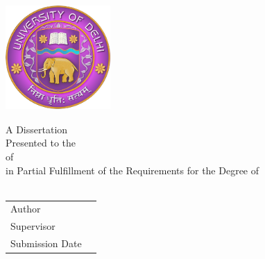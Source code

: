 \begin{titlepage}

\centering

\includegraphics[width=4cm, height=4cm]{res/du_logo.png}

\vspace{25mm}
{\huge\getTitle{}}

\vspace{30mm}
\begin{LARGE}
A Dissertation \\
Presented to the \getDepartment{} \\
of \getUniversity{} \\
in Partial Fulfillment of the Requirements for the Degree of \\
\getDegree{} \\
\end{LARGE}

\vspace{30mm}
\begin{Large}
\begin{tabular}{l r}
    Author & \getAuthor{} \\
    Supervisor & \getSupervisor{} \\
    Submission Date & \getSubmissionDate{} \\
\end{tabular}
\end{Large}

\end{titlepage}

